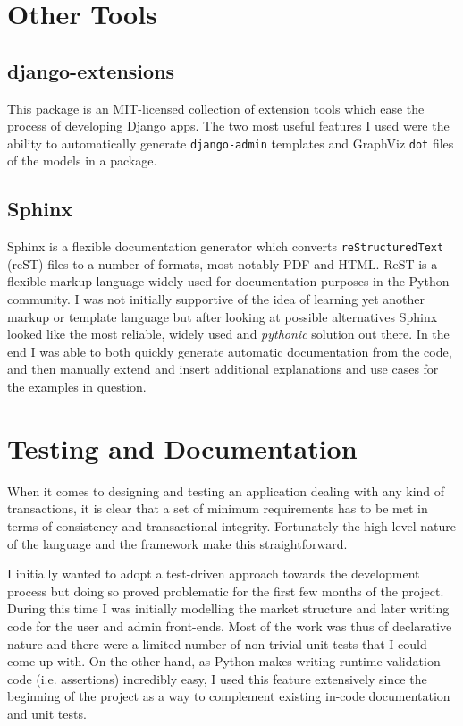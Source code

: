 \documentclass[bsc,frontabs,twoside,singlespacing,parskip,deptreport]{infthesis}     %
\begin{document}
\begin{itemize}
\section{Other Tools}

\subsection{django-extensions}
    This package is an MIT-licensed collection of extension tools which ease the process of developing Django apps. The two most useful features I used were the ability to automatically generate {\tt django-admin} templates and GraphViz {\tt dot} files of the models in a package. 

\subsection{Sphinx}
    Sphinx is a flexible documentation generator which converts {\tt reStructuredText} (reST) files to a number of formats, most notably PDF and HTML. ReST is a flexible markup language widely used for documentation purposes in the Python community. I was not initially supportive of the idea of learning yet another markup or template language but after looking at possible alternatives Sphinx looked like the most reliable, widely used and {\em pythonic} solution out there. In the end I was able to both quickly generate automatic documentation from the code, and then manually extend and insert additional explanations and use cases for the examples in question.

\section{Testing and Documentation}
    When it comes to designing and testing an application dealing with any kind of transactions, it is clear that a set of minimum requirements has to be met in terms of consistency and transactional integrity. Fortunately the high-level nature of the language and the framework make this straightforward.

I initially wanted to adopt a test-driven approach towards the development process but doing so proved problematic for the first few months of the project. During this time I was initially modelling the market structure and later writing code for the user and admin front-ends. Most of the work was thus of declarative nature and there were a limited number of non-trivial unit tests that I could come up with. On the other hand, as Python makes writing runtime validation code (i.e. assertions) incredibly easy, I used this feature extensively since the beginning of the project as a way to complement existing in-code documentation and unit tests. 


\end{itemize}
\end{document}
